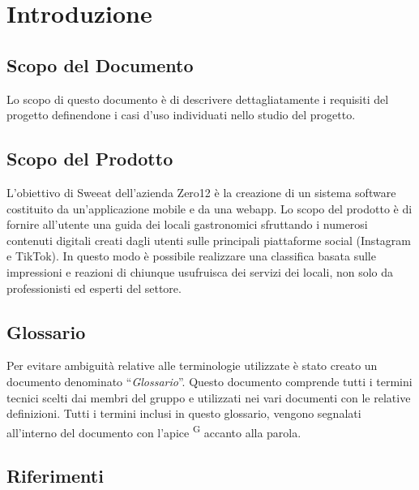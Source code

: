 \section{Introduzione}

\subsection{Scopo del Documento}
Lo scopo di questo documento è di descrivere dettagliatamente i requisiti del progetto definendone i casi d’uso individuati nello studio del progetto.

\subsection{Scopo del Prodotto}

L’obiettivo di Sweeat dell’azienda Zero12 è la creazione di un sistema software costituito da un’applicazione mobile e da una webapp. Lo scopo del prodotto è di fornire all’utente una guida dei locali gastronomici sfruttando i numerosi contenuti digitali creati dagli utenti sulle principali piattaforme social (Instagram e TikTok). In questo modo è possibile realizzare una classifica basata sulle impressioni e reazioni di chiunque usufruisca dei servizi dei locali, non solo da professionisti ed esperti del settore.

\subsection{Glossario}

Per evitare ambiguità relative alle terminologie utilizzate è stato creato un documento denominato “\textit{Glossario}”. Questo documento comprende tutti i termini tecnici scelti dai membri del gruppo e utilizzati nei vari documenti con le relative definizioni. Tutti i termini inclusi in questo glossario, vengono segnalati all’interno del documento con l’apice \textsuperscript{G} accanto alla parola.

\subsection{Riferimenti}


